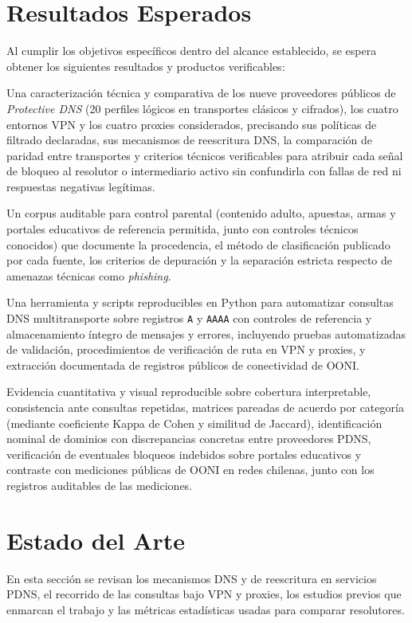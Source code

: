 \documentclass[10pt,a4paper]{article}
\begin{document}
\section{Resultados Esperados}

Al cumplir los objetivos específicos dentro del alcance establecido, se espera obtener los siguientes resultados y productos verificables:

Una caracterización técnica y comparativa de los nueve proveedores públicos de \emph{Protective DNS} (20 perfiles lógicos en transportes clásicos y cifrados), los cuatro entornos VPN y los cuatro proxies considerados, precisando sus políticas de filtrado declaradas, sus mecanismos de reescritura DNS, la comparación de paridad entre transportes y criterios técnicos verificables para atribuir cada señal de bloqueo al resolutor o intermediario activo sin confundirla con fallas de red ni respuestas negativas legítimas.

Un corpus auditable para control parental (contenido adulto, apuestas, armas y portales educativos de referencia permitida, junto con controles técnicos conocidos) que documente la procedencia, el método de clasificación publicado por cada fuente, los criterios de depuración y la separación estricta respecto de amenazas técnicas como \emph{phishing}.

Una herramienta y scripts reproducibles en Python para automatizar consultas DNS multitransporte sobre registros \texttt{A} y \texttt{AAAA} con controles de referencia y almacenamiento íntegro de mensajes y errores, incluyendo pruebas automatizadas de validación, procedimientos de verificación de ruta en VPN y proxies, y extracción documentada de registros públicos de conectividad de OONI.

Evidencia cuantitativa y visual reproducible sobre cobertura interpretable, consistencia ante consultas repetidas, matrices pareadas de acuerdo por categoría (mediante coeficiente Kappa de Cohen y similitud de Jaccard), identificación nominal de dominios con discrepancias concretas entre proveedores PDNS, verificación de eventuales bloqueos indebidos sobre portales educativos y contraste con mediciones públicas de OONI en redes chilenas, junto con los registros auditables de las mediciones.

\section{Estado del Arte}

En esta sección se revisan los mecanismos DNS y de reescritura en servicios PDNS, el recorrido de las consultas bajo VPN y proxies, los estudios previos que enmarcan el trabajo y las métricas estadísticas usadas para comparar resolutores.
\end{document}
